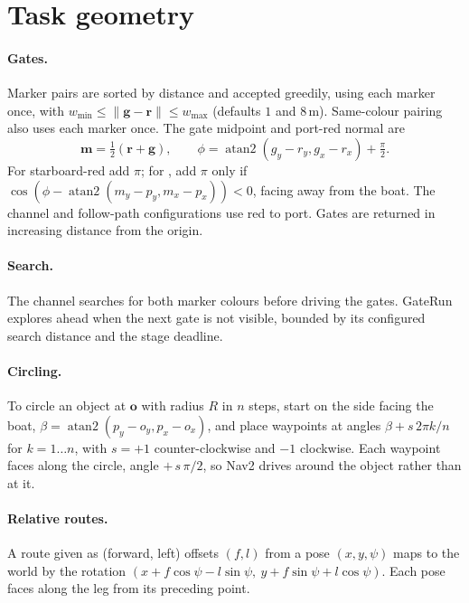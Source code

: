 \section{Task geometry}
\label{sec:tasks}

\paragraph{Gates.} Marker pairs are sorted by distance and accepted greedily,
using each marker once, with $w_{\min}\le\|\bm g-\bm r\|\le w_{\max}$
(defaults $1$ and $8$\,m). Same-colour pairing also uses each marker once.
The gate midpoint and port-red normal are
\[
 \bm m=\tfrac12(\bm r+\bm g),\qquad
 \phi=\operatorname{atan2}(g_y-r_y,g_x-r_x)+\tfrac\pi2.
\]
For starboard-red add $\pi$; for , add $\pi$ only if
$\cos(\phi-\operatorname{atan2}(m_y-p_y,m_x-p_x))<0$, facing away from the boat.
The channel and follow-path configurations use red to port. Gates are returned
in increasing distance from the origin.

\paragraph{Search.} The channel searches for both marker colours before driving
the gates. GateRun explores ahead when the next gate is not visible, bounded
by its configured search distance and the stage deadline.

\paragraph{Circling.} To circle an object at $\bm o$ with radius $R$ in $n$ steps,
start on the side facing the boat, $\beta = \operatorname{atan2}(p_y - o_y, p_x - o_x)$,
and place waypoints at angles $\beta + s\,2\pi k/n$ for $k = 1\ldots n$, with
$s=+1$ counter-clockwise and $-1$ clockwise. Each waypoint faces along the
circle, angle $+\,s\,\pi/2$, so Nav2 drives around the object rather than at it.

\paragraph{Relative routes.} A route given as (forward, left) offsets
$(f, l)$ from a pose $(x, y, \psi)$ maps to the world by the rotation
$\left(x + f\cos\psi - l\sin\psi,\ y + f\sin\psi + l\cos\psi\right)$.
Each pose faces along the leg from its preceding point.
